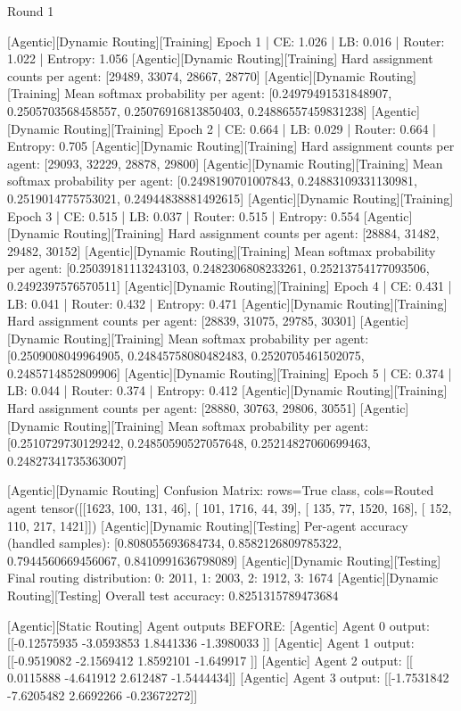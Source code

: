 Round 1

[Agentic][Dynamic Routing][Training] Epoch 1 | CE: 1.026 | LB: 0.016 | Router: 1.022 | Entropy: 1.056
[Agentic][Dynamic Routing][Training] Hard assignment counts per agent: [29489, 33074, 28667, 28770]
[Agentic][Dynamic Routing][Training] Mean softmax probability per agent: [0.24979491531848907, 0.2505703568458557, 0.25076916813850403, 0.24886557459831238]
[Agentic][Dynamic Routing][Training] Epoch 2 | CE: 0.664 | LB: 0.029 | Router: 0.664 | Entropy: 0.705
[Agentic][Dynamic Routing][Training] Hard assignment counts per agent: [29093, 32229, 28878, 29800]
[Agentic][Dynamic Routing][Training] Mean softmax probability per agent: [0.2498190701007843, 0.24883109331130981, 0.2519014775753021, 0.24944838881492615]
[Agentic][Dynamic Routing][Training] Epoch 3 | CE: 0.515 | LB: 0.037 | Router: 0.515 | Entropy: 0.554
[Agentic][Dynamic Routing][Training] Hard assignment counts per agent: [28884, 31482, 29482, 30152]
[Agentic][Dynamic Routing][Training] Mean softmax probability per agent: [0.25039181113243103, 0.2482306808233261, 0.25213754177093506, 0.2492397576570511]
[Agentic][Dynamic Routing][Training] Epoch 4 | CE: 0.431 | LB: 0.041 | Router: 0.432 | Entropy: 0.471
[Agentic][Dynamic Routing][Training] Hard assignment counts per agent: [28839, 31075, 29785, 30301]
[Agentic][Dynamic Routing][Training] Mean softmax probability per agent: [0.2509008049964905, 0.24845758080482483, 0.2520705461502075, 0.2485714852809906]
[Agentic][Dynamic Routing][Training] Epoch 5 | CE: 0.374 | LB: 0.044 | Router: 0.374 | Entropy: 0.412
[Agentic][Dynamic Routing][Training] Hard assignment counts per agent: [28880, 30763, 29806, 30551]
[Agentic][Dynamic Routing][Training] Mean softmax probability per agent: [0.2510729730129242, 0.24850590527057648, 0.25214827060699463, 0.24827341735363007]

[Agentic][Dynamic Routing] Confusion Matrix: rows=True class, cols=Routed agent
tensor([[1623,  100,  131,   46],
[ 101, 1716,   44,   39],
[ 135,   77, 1520,  168],
[ 152,  110,  217, 1421]])
[Agentic][Dynamic Routing][Testing] Per-agent accuracy (handled samples): [0.808055693684734, 0.8582126809785322, 0.7944560669456067, 0.8410991636798089]
[Agentic][Dynamic Routing][Testing] Final routing distribution: {0: 2011, 1: 2003, 2: 1912, 3: 1674}
[Agentic][Dynamic Routing][Testing] Overall test accuracy: 0.8251315789473684

[Agentic][Static Routing] Agent outputs BEFORE:
[Agentic] Agent 0 output: [[-0.12575935 -3.0593853   1.8441336  -1.3980033 ]]
[Agentic] Agent 1 output: [[-0.9519082 -2.1569412  1.8592101 -1.649917 ]]
[Agentic] Agent 2 output: [[ 0.0115888 -4.641912   2.612487  -1.5444434]]
[Agentic] Agent 3 output: [[-1.7531842  -7.6205482   2.6692266  -0.23672272]]

